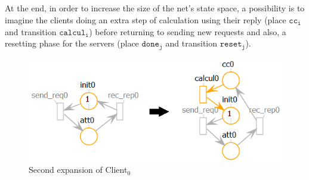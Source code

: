 \documentclass{article}
\begin{document}
	\subparagraph{}At the end, in order to increase the size of the net's state space, a possibility is to imagine the clients doing an extra step of calculation using their reply (place $\mathtt{cc_i}$ and transition $\mathtt{calcul_i}$) before returning to sending new requests and also, a resetting phase for the servers (place $\mathtt{done_j}$ and transition $\mathtt{reset_j}$).
	
	\begin{figure}[h]
		\centering
		\includegraphics[scale=0.7]{client2}
		\caption{Second expansion of Client$_0$}
	\end{figure}
\end{document}
